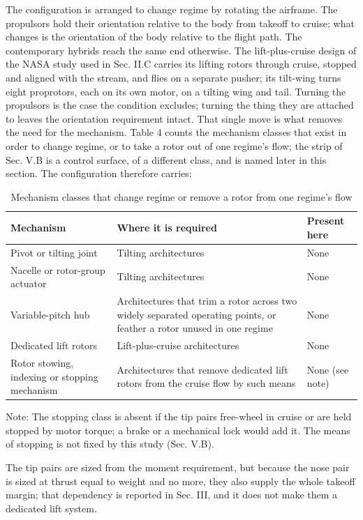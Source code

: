 \documentclass[journal]{new-aiaa}
\begin{document}
The configuration is arranged to change regime by rotating the airframe. The propulsors hold their orientation relative to the body from takeoff to cruise; what changes is the orientation of the body relative to the flight path. The contemporary hybrids reach the same end otherwise. The lift-plus-cruise design of the NASA study used in Sec. II.C carries its lifting rotors through cruise, stopped and aligned with the stream, and flies on a separate pusher; its tilt-wing turns eight proprotors, each on its own motor, on a tilting wing and tail. Turning the propulsors is the case the condition excludes; turning the thing they are attached to leaves the orientation requirement intact. That single move is what removes the need for the mechanism. Table 4 counts the mechanism classes that exist in order to change regime, or to take a rotor out of one regime's flow; the strip of Sec. V.B is a control surface, of a different class, and is named later in this section. The configuration therefore carries:

\begin{table}[htbp]
\centering
\caption{Mechanism classes that change regime or remove a rotor from one regime's flow}
\label{tab:4}
\small
\begin{tabularx}{\linewidth}{XXX}
\hline
Mechanism & Where it is required & Present here \\ \hline
Pivot or tilting joint & Tilting architectures & None \\
Nacelle or rotor-group actuator & Tilting architectures & None \\
Variable-pitch hub & Architectures that trim a rotor across two widely separated operating points, or feather a rotor unused in one regime & None \\
Dedicated lift rotors & Lift-plus-cruise architectures & None \\
Rotor stowing, indexing or stopping mechanism & Architectures that remove dedicated lift rotors from the cruise flow by such means & None (see note) \\
\hline
\end{tabularx}
\end{table}

Note: The stopping class is absent if the tip pairs free-wheel in cruise or are held stopped by motor torque; a brake or a mechanical lock would add it. The means of stopping is not fixed by this study (Sec. V.B).

The tip pairs are sized from the moment requirement, but because the nose pair is sized at thrust equal to weight and no more, they also supply the whole takeoff margin; that dependency is reported in Sec. III, and it does not make them a dedicated lift system.
\end{document}
